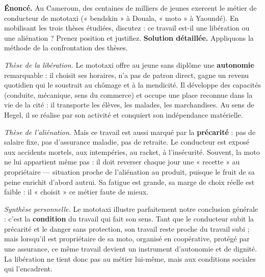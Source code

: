 \documentclass[11pt]{article}
\begin{document}
\begin{exoresolu}
\textbf{Énoncé.} Au Cameroun, des centaines de milliers de jeunes exercent le métier de conducteur de mototaxi (« bendskin » à Douala, « moto » à Yaoundé). En mobilisant les trois thèses étudiées, discutez : ce travail est-il une libération ou une aliénation ? Prenez position et justifiez.
\tcblower
\textbf{Solution détaillée.} Appliquons la méthode de la confrontation des thèses.

\emph{Thèse de la libération.} Le mototaxi offre au jeune sans diplôme une \textbf{autonomie} remarquable : il choisit ses horaires, n'a pas de patron direct, gagne un revenu quotidien qui le soustrait au chômage et à la mendicité. Il développe des capacités (conduite, mécanique, sens du commerce) et occupe une place reconnue dans la vie de la cité : il transporte les élèves, les malades, les marchandises. Au sens de Hegel, il se réalise par son activité et conquiert son indépendance matérielle.

\emph{Thèse de l'aliénation.} Mais ce travail est aussi marqué par la \textbf{précarité} : pas de salaire fixe, pas d'assurance maladie, pas de retraite. Le conducteur est exposé aux accidents mortels, aux intempéries, au racket, à l'insécurité. Souvent, la moto ne lui appartient même pas : il doit reverser chaque jour une « recette » au propriétaire — situation proche de l'aliénation au produit, puisque le fruit de sa peine enrichit d'abord autrui. Sa fatigue est grande, sa marge de choix réelle est faible : il « choisit » ce métier faute de mieux.

\emph{Synthèse personnelle.} Le mototaxi illustre parfaitement notre conclusion générale : c'est la \textbf{condition} du travail qui fait son sens. Tant que le conducteur subit la précarité et le danger sans protection, son travail reste proche du travail subi ; mais lorsqu'il est propriétaire de sa moto, organisé en coopérative, protégé par une assurance, ce même travail devient un instrument d'autonomie et de dignité. La libération ne tient donc pas au métier lui-même, mais aux conditions sociales qui l'encadrent.
\end{exoresolu}
\end{document}
